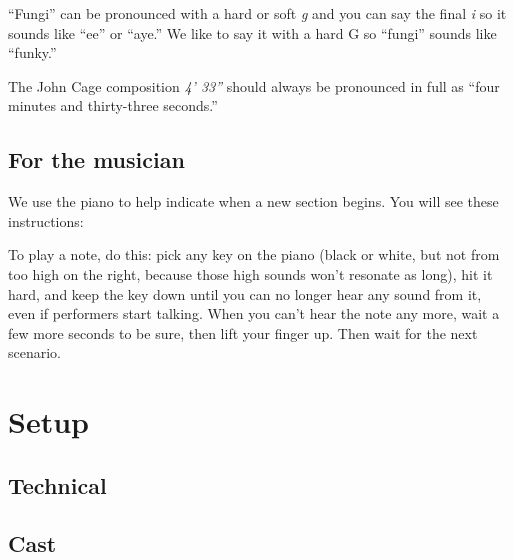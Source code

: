 ``Fungi'' can be pronounced with a hard or soft \textit{g} and you can say the final \textit{i} so it sounds like ``ee'' or ``aye.''  We like to say it with a hard G so ``fungi'' sounds like ``funky.''

The John Cage composition \textit{4' 33''} should always be pronounced in full as ``four minutes and thirty-three seconds.''

\subsection*{For the musician}

We use the piano to help indicate when a new section begins.  You will see these instructions:


To play a note, do this:  pick any key on the piano (black or white, but not from too high on the right, because those high sounds won't resonate as long), hit it hard, and keep the key down until you can no longer hear any sound from it, even if performers start talking.  When you can't hear the note any more, wait a few more seconds to be sure, then lift your finger up.  Then wait for the next scenario.

\newpage

\section{Setup}

\subsection{Technical}





\newpage

\subsection{Cast}



